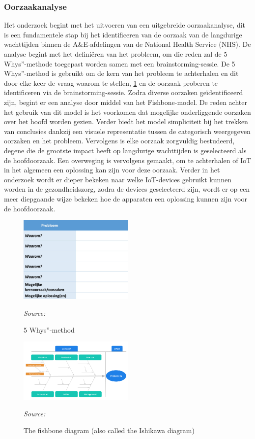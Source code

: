 \subsubsection*{Oorzaakanalyse}
Het onderzoek begint met het uitvoeren van een uitgebreide oorzaakanalyse, dit is een fundamentele stap bij het identificeren van de oorzaak van de langdurige wachttijden binnen de A\&E-afdelingen van de National Health Service (NHS). De analyse begint met het definiëren van het probleem, om die reden zal de 5 Whys”-methode toegepast worden samen met een brainstorming-sessie. De 5 Whys”-method is gebruikt om de kern van het probleem te achterhalen en dit door elke keer de vraag waarom te stellen, \ref{fig:Figuur5} en de oorzaak proberen te identificeren via de brainstorming-sessie. Zodra diverse oorzaken geïdentificeerd zijn, begint er een analyse door middel van het Fishbone-model. De reden achter het gebruik van dit model is het voorkomen dat mogelijke onderliggende oorzaken over het hoofd worden gezien. Verder biedt het model simpliciteit bij het trekken van conclusies dankzij een visuele representatie tussen de categorisch weergegeven oorzaken en het probleem. Vervolgens is elke oorzaak zorgvuldig bestudeerd, degene die de grootste impact heeft op langdurige wachttijden is geselecteerd als de hoofdoorzaak. Een overweging is vervolgens gemaakt, om te achterhalen of IoT in het algemeen een oplossing kan zijn voor deze oorzaak. Verder in het onderzoek wordt er dieper bekeken naar welke IoT-devices gebruikt kunnen worden in de gezondheidszorg, zodra de devices geselecteerd zijn, wordt er op een meer diepgaande wijze bekeken hoe de apparaten een oplossing kunnen zijn voor de hoofdoorzaak.

\begin{figure}[h]
    \centering
    \includegraphics[width=0.5\textwidth]{img/Figuur-5}
    \caption{5 Whys”-method}
    \label{fig:Figuur5}
    \textit{Source: \autocite{Scharwaechter2023}}
\end{figure}

\begin{figure}[h]
    \centering
    \includegraphics[width=0.5\textwidth]{img/Figuur-6}
    \caption{The fishbone diagram (also called the Ishikawa diagram)}
    \label{fig:Figuur6}
    \textit{Source: \autocite{Swaen2023}}
\end{figure}


